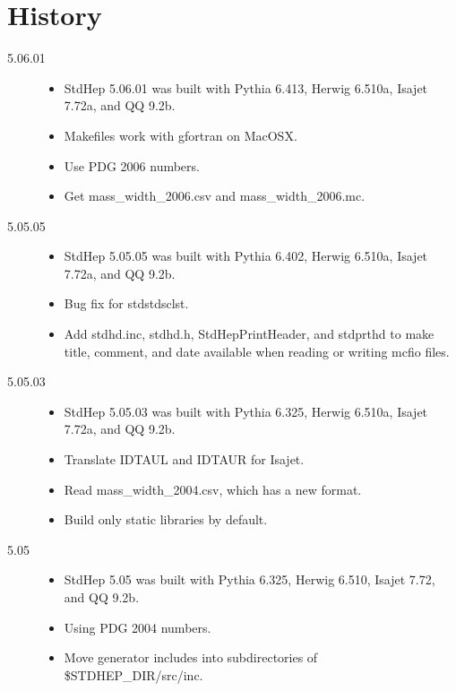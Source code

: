 
\section {History}

\begin{description}

\item[5.06.01]

\begin{itemize}
\item StdHep 5.06.01 was built with Pythia 6.413, Herwig 6.510a,
      Isajet 7.72a, and QQ 9.2b.
\item Makefiles work with gfortran on MacOSX.
\item Use PDG 2006 numbers.
\item Get mass\_width\_2006.csv and mass\_width\_2006.mc.
\end{itemize}


\item[5.05.05]

\begin{itemize}
\item StdHep 5.05.05 was built with Pythia 6.402, Herwig 6.510a,
      Isajet 7.72a, and QQ 9.2b.
\item Bug fix for stdstdsclst.
\item Add stdhd.inc, stdhd.h, StdHepPrintHeader, and stdprthd
      to make title, comment, and date available when
      reading or writing mcfio files.
\end{itemize}

\item[5.05.03]

\begin{itemize}
\item StdHep 5.05.03 was built with Pythia 6.325, Herwig 6.510a,
      Isajet 7.72a, and QQ 9.2b.
\item Translate IDTAUL and IDTAUR for Isajet.
\item Read mass\_width\_2004.csv, which has a new format.
\item Build only static libraries by default.
\end{itemize}


\item[5.05]

\begin{itemize}
\item StdHep 5.05 was built with Pythia 6.325, Herwig 6.510,
      Isajet 7.72, and QQ 9.2b.
\item Using PDG 2004 numbers.
\item Move generator includes into subdirectories of \$STDHEP\_DIR/src/inc.
\end{itemize}


\end{description}
